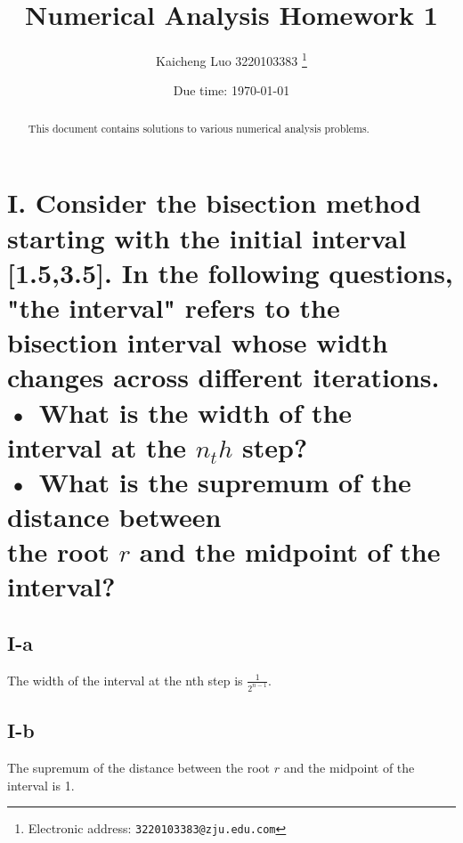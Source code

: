 \documentclass[a4paper]{article}
\begin{document}
\title{Numerical Analysis Homework 1}

\author{Kaicheng Luo 3220103383
  \thanks{Electronic address: \texttt{3220103383@zju.edu.com}}}

\date{Due time: \today}

\maketitle

\begin{abstract}
    This document contains solutions to various numerical analysis problems.
\end{abstract}

\section*{I. Consider the bisection method starting with the initial interval [1.5,3.5]. In the following questions, "the interval" refers to the bisection interval whose width changes across different iterations.\\
 • What is the width of the interval at the \(n_th\) step?\\
 • What is the supremum of the distance between\\
 the root \( r \) and the midpoint of the interval?}

\subsection*{I-a}
The width of the interval at the nth step is \( \frac{1}{2^{n-1}} \).

\subsection*{I-b}
The supremum of the distance between the root \( r \) and the midpoint of the interval is 1.
\end{document}
